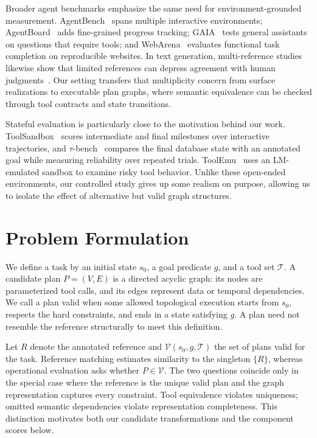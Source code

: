 \documentclass[10pt]{article}
\begin{document}
Broader agent benchmarks emphasize the same need for environment-grounded
measurement. AgentBench~\cite{liu2023agentbench} spans multiple interactive
environments; AgentBoard~\cite{ma2024agentboard} adds fine-grained progress
tracking; GAIA~\cite{mialon2024gaia} tests general assistants on questions that
require tools; and WebArena~\cite{zhou2024webarena} evaluates functional task
completion on reproducible websites. In text generation, multi-reference
studies likewise show that limited references can depress agreement with human
judgments~\cite{gupta2019multireference,tang2024divref,zeng2024multireference}.
Our setting transfers that multiplicity concern from surface realizations to
executable plan graphs, where semantic equivalence can be checked through tool
contracts and state transitions.

Stateful evaluation is particularly close to the motivation behind our work.
ToolSandbox~\cite{lu2025toolsandbox} scores intermediate and final milestones
over interactive trajectories, and $\tau$-bench~\cite{yao2025taubench} compares
the final database state with an annotated goal while measuring reliability
over repeated trials. ToolEmu~\cite{ruan2024toolemu} uses an LM-emulated sandbox
to examine risky tool behavior. Unlike these open-ended environments, our
controlled study gives up some realism on purpose, allowing us to isolate the
effect of alternative but valid graph structures.

\section{Problem Formulation}
We define a task by an initial state $s_0$, a goal predicate $g$, and a tool
set $\mathcal{T}$. A candidate plan $P=(V,E)$ is a directed acyclic graph:
its nodes are parameterized tool calls, and its edges represent data or
temporal dependencies. We call a plan valid when some allowed topological
execution starts from $s_0$, respects the hard constraints, and ends in a
state satisfying $g$. A plan need not resemble the reference structurally to
meet this definition.

Let $R$ denote the annotated reference and $\mathcal{V}(s_0,g,\mathcal{T})$
the set of plans valid for the task. Reference matching estimates similarity
to the singleton $\{R\}$, whereas operational evaluation asks whether
$P\in\mathcal{V}$. The two questions coincide only in the special case where
the reference is the unique valid plan and the graph representation captures
every constraint.
Tool equivalence violates uniqueness; omitted semantic dependencies violate
representation completeness. This distinction motivates both our candidate
transformations and the component scores below.
\end{document}
